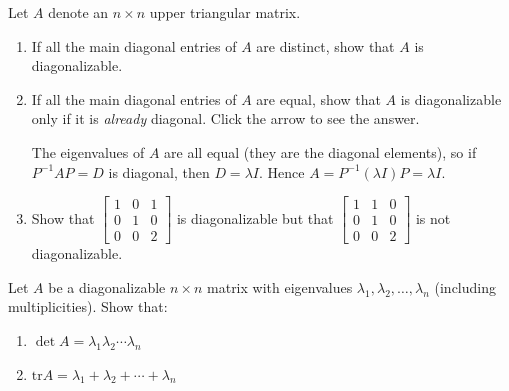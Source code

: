 \documentclass{ximera}
\begin{document}



\begin{problem}\label{prb:upper_triangular_case}
Let $A$ denote an $n \times n$ upper triangular matrix.
\begin{enumerate}
\item If all the main diagonal entries of $A$ are distinct, show that $A$ is diagonalizable.

\item If all the main diagonal entries of $A$ are equal, show that $A$ is diagonalizable only if it is \textit{already} diagonal.
Click the arrow to see the answer.
\begin{expandable}{}{}
The eigenvalues of $A$ are all equal (they are the diagonal elements), so if $P^{-1}AP = D$ is diagonal, then $D = \lambda I$. Hence $A = P^{-1}(\lambda I)P = \lambda I$.
\end{expandable}

\item Show that $\begin{bmatrix}
1 & 0 & 1 \\
0 & 1 & 0 \\
0 & 0 & 2
\end{bmatrix}$ is diagonalizable but that $\begin{bmatrix}
 1 & 1 & 0 \\
 0 & 1 & 0 \\
 0 & 0 & 2
 \end{bmatrix}$ is not diagonalizable.
 
\end{enumerate}

\end{problem}

\begin{problem}\label{prb:det_and_tr_diagonalizable}
Let $A$ be a diagonalizable $n \times n$ matrix with eigenvalues $\lambda_{1}, \lambda_{2}, \dots, \lambda_{n}$ (including multiplicities). Show that:

\begin{enumerate}
\item $\det A = \lambda_{1}\lambda_{2}\cdots \lambda_{n}$
\item $\mbox{tr} A = \lambda_{1} + \lambda_{2} + \cdots + \lambda_{n}$
\end{enumerate}
\end{problem}
\end{document}

